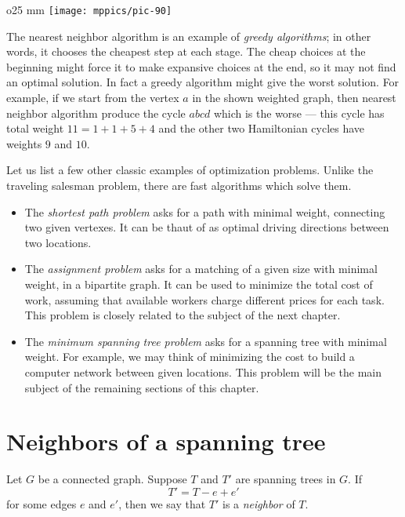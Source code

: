 \begin{wrapfigure}{o}{25 mm}
\vskip-0mm
\centering
\texttt{[image: mppics/pic-90]}
\end{wrapfigure}

The nearest neighbor algorithm is an example of \emph{greedy algorithms};
in other words, it chooses the cheapest step at each stage.
The cheap choices at the beginning might force it to make expansive choices at the end,
so it may not find an optimal solution. 
In fact a greedy algorithm might give the worst solution.
For example, if we start from the vertex $a$ in the shown weighted graph, then nearest neighbor algorithm produce the cycle $abcd$ which is the worse --- this cycle has total weight $11=1+1+5+4$ and the other two  Hamiltonian cycles have weights $9$ and $10$.

Let us list a few other classic examples of optimization problems.
Unlike the traveling salesman problem, there are fast algorithms which solve them.
\begin{itemize}
\item The \emph{shortest path problem} asks for a path with minimal weight, connecting two given vertexes.
It can be thaut of as optimal driving directions between two locations.
\item The \label{assignment problem}\emph{assignment problem} asks for a matching of a given size with minimal weight, in a bipartite graph.
It can be used to minimize the total cost of work, assuming that available workers charge different prices for each task.
This problem is closely related to the subject of the next chapter.
\item The \emph{minimum spanning tree problem} asks for a spanning tree with minimal weight.
For example, we may think of minimizing the cost to build a computer network between given locations.
This problem will be the main subject of the remaining sections of this chapter.
\end{itemize}


\section*{Neighbors of a spanning tree}

Let $G$ be a connected graph.
Suppose $T$ and $T'$ are spanning trees in $G$.
If 
\[T'=T-e+e'\]
for some edges $e$ and $e'$,
then we say that $T'$ is a \emph{neighbor} of $T$.

